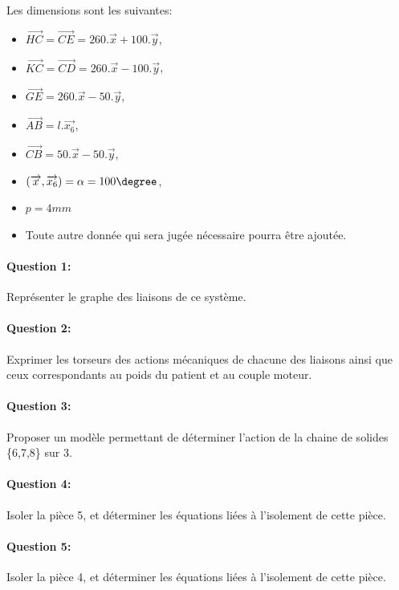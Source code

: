 \normalsize

Les dimensions sont les suivantes:

\begin{itemize}
 \item $\overrightarrow{HC}=\overrightarrow{CE}=260.\overrightarrow{x}+100.\overrightarrow{y}$,
 \item $\overrightarrow{KC}=\overrightarrow{CD}=260.\overrightarrow{x}-100.\overrightarrow{y}$,
 \item $\overrightarrow{GE}=260.\overrightarrow{x}-50.\overrightarrow{y}$,
 \item $\overrightarrow{AB}=l.\overrightarrow{x_6}$,
 \item $\overrightarrow{CB}=50.\overrightarrow{x}-50.\overrightarrow{y}$,
 \item $(\overrightarrow{x},\overrightarrow{x_6})=\alpha=100\degree$,
 \item $p=4mm$
 \item Toute autre donnée qui sera jugée nécessaire pourra être ajoutée.
\end{itemize}

\paragraph{Question 1:} Représenter le graphe des liaisons de ce système.

\paragraph{Question 2:} Exprimer les torseurs des actions mécaniques de chacune des liaisons ainsi que ceux correspondants au poids du patient et au couple moteur.

\paragraph{Question 3:} Proposer un modèle permettant de déterminer l'action de la chaine de solides \{6,7,8\} sur 3.
 
\paragraph{Question 4:} Isoler la pièce 5, et déterminer les équations liées à l'isolement de cette pièce.

\paragraph{Question 5:} Isoler la pièce 4, et déterminer les équations liées à l'isolement de cette pièce.

